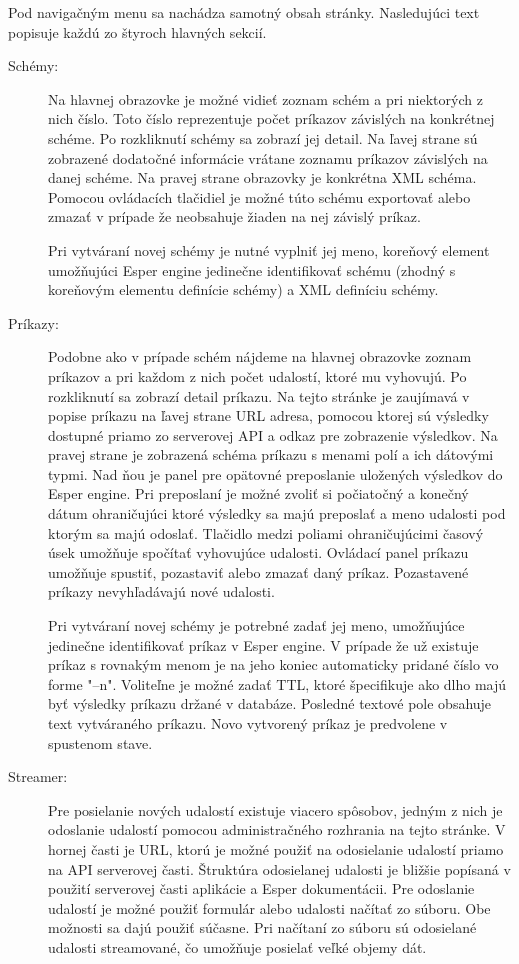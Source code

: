 	Pod navigačným menu sa nachádza samotný obsah stránky. Nasledujúci text popisuje každú zo štyroch hlavných sekcií.
	\begin{description}
		\item[Schémy:] Na hlavnej obrazovke je možné vidieť zoznam schém a pri niektorých z nich číslo. Toto číslo reprezentuje počet príkazov závislých na konkrétnej schéme. Po rozkliknutí schémy sa zobrazí jej detail. Na ľavej strane sú zobrazené dodatočné informácie vrátane zoznamu príkazov závislých na danej schéme. Na pravej strane obrazovky je konkrétna XML schéma. Pomocou ovládacích tlačidiel je možné túto schému exportovať alebo zmazať v prípade že neobsahuje žiaden na nej závislý príkaz.

		Pri vytváraní novej schémy je nutné vyplniť jej meno, koreňový element umožňujúci Esper engine jedinečne identifikovať schému (zhodný s koreňovým elementu definície schémy) a XML definíciu schémy.

		\item[Príkazy:] Podobne ako v prípade schém nájdeme na hlavnej obrazovke zoznam príkazov a pri každom z nich počet udalostí, ktoré mu vyhovujú. Po rozkliknutí sa zobrazí detail príkazu. Na tejto stránke je zaujímavá v popise príkazu na ľavej strane URL adresa, pomocou ktorej sú výsledky dostupné priamo zo serverovej API a odkaz pre zobrazenie výsledkov.
		Na pravej strane je zobrazená schéma príkazu s menami polí a ich dátovými typmi. Nad ňou je panel pre opätovné preposlanie uložených výsledkov do Esper engine. Pri preposlaní je možné zvoliť si počiatočný a konečný dátum ohraničujúci ktoré výsledky sa majú preposlať a meno udalosti pod ktorým sa majú odoslať. Tlačidlo medzi poliami ohraničujúcimi časový úsek umožňuje spočítať vyhovujúce udalosti.
		Ovládací panel príkazu umožňuje spustiť, pozastaviť alebo zmazať daný príkaz. Pozastavené príkazy nevyhľadávajú nové udalosti.
		
		Pri vytváraní novej schémy je potrebné zadať jej meno, umožňujúce jedinečne identifikovať príkaz v Esper engine. V prípade že už existuje príkaz s rovnakým menom je na jeho koniec automaticky pridané číslo vo forme "--n". Voliteľne je možné zadať TTL, ktoré špecifikuje ako dlho majú byť výsledky príkazu držané v databáze. Posledné textové pole obsahuje text vytváraného príkazu. Novo vytvorený príkaz je predvolene v spustenom stave.
		
		\item[Streamer:] Pre posielanie nových udalostí existuje viacero spôsobov, jedným z nich je odoslanie udalostí pomocou administračného rozhrania na tejto stránke. V hornej časti je URL, ktorú je možné použiť na odosielanie udalostí priamo na API serverovej časti. Štruktúra odosielanej udalosti je bližšie popísaná v použití serverovej časti aplikácie a Esper dokumentácii.
		Pre odoslanie udalostí je možné použiť formulár alebo udalosti načítať zo súboru. Obe možnosti sa dajú použiť súčasne. Pri načítaní zo súboru sú odosielané udalosti streamované, čo umožňuje posielať veľké objemy dát.


\end{description}
